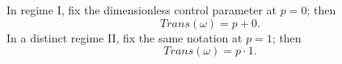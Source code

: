 \documentclass{article}
\begin{document}
In regime I, fix the dimensionless control parameter at $p=0$; then
\begin{equation}
Trans(\omega)=p+0 .\label{regime-one}
\end{equation}
In a distinct regime II, fix the same notation at $p=1$; then
\begin{equation}
Trans(\omega)=p\cdot 1 .\label{regime-two}
\end{equation}
\end{document}
